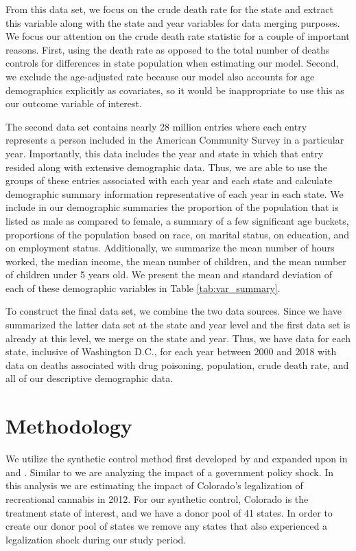 \documentclass{article}
\begin{document}
From this data set, we focus on the crude death rate for the state and extract this variable along with the state and year variables for data merging purposes. We focus our attention on the crude death rate statistic for a couple of important reasons. First, using the death rate as opposed to the total number of deaths controls for differences in state population when estimating our model. Second, we exclude the age-adjusted rate because our model also accounts for age demographics explicitly as covariates, so it would be inappropriate to use this as our outcome variable of interest.

The second data set contains nearly 28 million entries where each entry represents a person included in the American Community Survey in a particular year.  Importantly, this data includes the year and state in which that entry resided along with extensive demographic data. Thus, we are able to use the groups of these entries associated with each year and each state and calculate demographic summary information representative of each year in each state. We include in our demographic summaries the proportion of the population that is listed as male as compared to female, a summary of a few significant age buckets, proportions of the population based on race, on marital status, on education, and on employment status. Additionally, we summarize the mean number of hours worked, the median income, the mean number of children, and the mean number of children under 5 years old. We present the mean and standard deviation of each of these demographic variables in Table \ref{tab:var_summary}.

To construct the final data set, we combine the two data sources. Since we have summarized the latter data set at the state and year level and the first data set is already at this level, we merge on the state and year. Thus, we have data for each state, inclusive of Washington D.C., for each year between 2000 and 2018 with data on deaths associated with drug poisoning, population, crude death rate, and all of our descriptive demographic data.



\section{Methodology}

We utilize the synthetic control method first developed by \citet{AbadieA2003TECo} and expanded upon in \citet{AbadieAlberto2010SCMf} and \citet{AbadieAlberto2015CPat}. Similar to \citet{AbadieAlberto2010SCMf} we are analyzing the impact of a government policy shock. In this analysis we are estimating the impact of Colorado's legalization of recreational cannabis in 2012. For our synthetic control, Colorado is the treatment state of interest, and we have a donor pool of 41 states. In order to create our donor pool of states we remove any states that also experienced a legalization shock during our study period.
\end{document}
